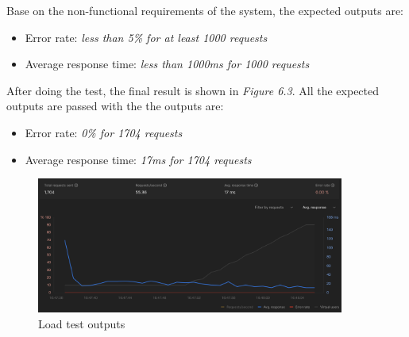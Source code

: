Base on the non-functional requirements of the system, the expected outputs are:
\begin{itemize}
  \item Error rate: \textit{less than 5\% for at least 1000 requests}
  \item Average response time: \textit{less than 1000ms for 1000 requests}
\end{itemize}

After doing the test, the final result is shown in \textit{Figure 6.3}. All the expected outputs are passed with the the outputs are:
\begin{itemize}
  \item Error rate: \textit{0\% for 1704 requests}
  \item Average response time: \textit{17ms for 1704 requests}
\end{itemize}

\begin{figure}[H]
  \centering
  \includegraphics[width=0.9\textwidth]{Figures/load_test.png}
  \caption{Load test outputs}
\end{figure}